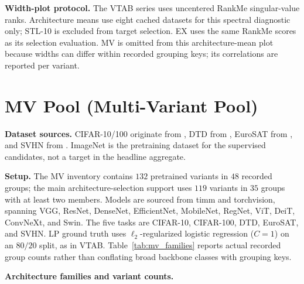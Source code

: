 \documentclass{article}
\begin{document}
\textbf{Width-plot protocol.} The VTAB series uses uncentered RankMe singular-value ranks. Architecture means use eight cached datasets for this spectral diagnostic only; STL-10 is excluded from target selection. EX uses the same RankMe scores as its selection evaluation. MV is omitted from this architecture-mean plot because widths can differ within recorded grouping keys; its correlations are reported per variant.



\section{MV Pool (Multi-Variant Pool)}
\label{app:mv_pool}

\textbf{Dataset sources.} CIFAR-10/100 originate from \citet{krizhevsky2009cifar}, DTD from \citet{cimpoi2014dtd}, EuroSAT from \citet{helber2017eurosat}, and SVHN from \citet{netzer2011svhn}. ImageNet \citep{deng2009imagenet} is the pretraining dataset for the supervised candidates, not a target in the headline aggregate.

\textbf{Setup.} The MV inventory contains $132$ pretrained variants in $48$ recorded groups; the main architecture-selection support uses $119$ variants in $35$ groups with at least two members. Models are sourced from timm \citep{wightman2019timm} and torchvision, spanning VGG, ResNet, DenseNet, EfficientNet, MobileNet, RegNet, ViT, DeiT, ConvNeXt, and Swin. The five tasks are CIFAR-10, CIFAR-100, DTD, EuroSAT, and SVHN. LP ground truth uses $\ell_2$-regularized logistic regression ($C=1$) on an $80/20$ split, as in VTAB. Table~\ref{tab:mv_families} reports actual recorded group counts rather than conflating broad backbone classes with grouping keys.

\textbf{Architecture families and variant counts.}
\end{document}
